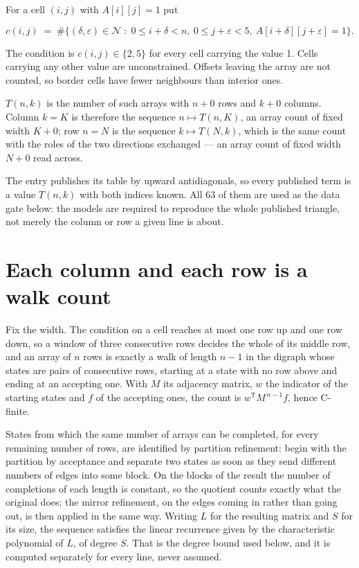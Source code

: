 \documentclass[11pt]{article}
\theoremstyle{definition}
\begin{document}
For a cell $(i,j)$ with $A[i][j] = 1$ put

\[c(i,j) \;=\; \#\bigl\{(\delta,\varepsilon)\in\mathcal{N} \;:\; 0\le i+\delta<n,\ 0\le j+\varepsilon<5,\ A[i+\delta][j+\varepsilon] = 1\bigr\}.\]

The condition is $c(i,j) \in \{2, 5\}$ for every cell carrying the value 1. Cells carrying any other value are unconstrained. Offsets leaving the array are not counted, so border cells have fewer neighbours than interior ones.

$T(n,k)$ is the number of such arrays with $n + 0$ rows and $k + 0$ columns. Column $k = K$ is therefore the sequence $n \mapsto T(n,K)$, an array count of fixed width $K + 0$; row $n = N$ is the sequence $k \mapsto T(N,k)$, which is the same count with the roles of the two directions exchanged --- an array count of fixed width $N + 0$ read across.

The entry publishes its table by upward antidiagonals, so every published term is a value $T(n,k)$ with both indices known. All 63 of them are used as the data gate below: the models are required to reproduce the whole published triangle, not merely the column or row a given line is about.

\section{Each column and each row is a walk count}

Fix the width. The condition on a cell reaches at most one row up and one row down, so a window of three consecutive rows decides the whole of its middle row, and an array of $n$ rows is exactly a walk of length $n-1$ in the digraph whose states are pairs of consecutive rows, starting at a state with no row above and ending at an accepting one. With $M$ its adjacency matrix, $w$ the indicator of the starting states and $f$ of the accepting ones, the count is $w^{\mathsf T}M^{\,n-1}f$, hence C-finite.

States from which the same number of arrays can be completed, for every remaining number of rows, are identified by partition refinement: begin with the partition by acceptance and separate two states as soon as they send different numbers of edges into some block. On the blocks of the result the number of completions of each length is constant, so the quotient counts exactly what the original does; the mirror refinement, on the edges coming in rather than going out, is then applied in the same way. Writing $L$ for the resulting matrix and $S$ for its size, the sequence satisfies the linear recurrence given by the characteristic polynomial of $L$, of degree $S$. That is the degree bound used below, and it is computed separately for every line, never assumed.
\end{document}
